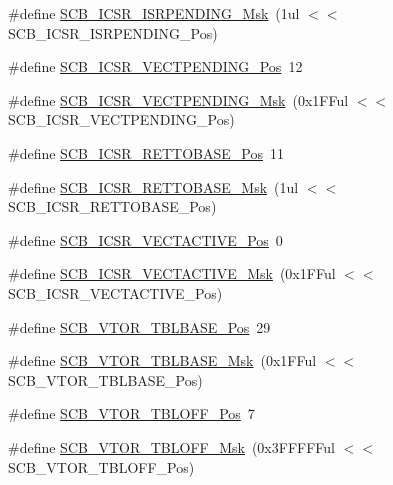 \begin{DoxyCompactItemize}
\item 
\#define \hyperlink{group__CMSIS__CM3__SCB_ga056d74fd538e5d36d3be1f28d399c877}{S\+C\+B\+\_\+\+I\+C\+S\+R\+\_\+\+I\+S\+R\+P\+E\+N\+D\+I\+N\+G\+\_\+\+Msk}~(1ul $<$$<$ S\+C\+B\+\_\+\+I\+C\+S\+R\+\_\+\+I\+S\+R\+P\+E\+N\+D\+I\+N\+G\+\_\+\+Pos)
\item 
\#define \hyperlink{group__CMSIS__CM3__SCB_gada60c92bf88d6fd21a8f49efa4a127b8}{S\+C\+B\+\_\+\+I\+C\+S\+R\+\_\+\+V\+E\+C\+T\+P\+E\+N\+D\+I\+N\+G\+\_\+\+Pos}~12
\item 
\#define \hyperlink{group__CMSIS__CM3__SCB_gacb6992e7c7ddc27a370f62878a21ef72}{S\+C\+B\+\_\+\+I\+C\+S\+R\+\_\+\+V\+E\+C\+T\+P\+E\+N\+D\+I\+N\+G\+\_\+\+Msk}~(0x1\+F\+Ful $<$$<$ S\+C\+B\+\_\+\+I\+C\+S\+R\+\_\+\+V\+E\+C\+T\+P\+E\+N\+D\+I\+N\+G\+\_\+\+Pos)
\item 
\#define \hyperlink{group__CMSIS__CM3__SCB_ga403d154200242629e6d2764bfc12a7ec}{S\+C\+B\+\_\+\+I\+C\+S\+R\+\_\+\+R\+E\+T\+T\+O\+B\+A\+S\+E\+\_\+\+Pos}~11
\item 
\#define \hyperlink{group__CMSIS__CM3__SCB_gaca6fc3f79bb550f64fd7df782ed4a5f6}{S\+C\+B\+\_\+\+I\+C\+S\+R\+\_\+\+R\+E\+T\+T\+O\+B\+A\+S\+E\+\_\+\+Msk}~(1ul $<$$<$ S\+C\+B\+\_\+\+I\+C\+S\+R\+\_\+\+R\+E\+T\+T\+O\+B\+A\+S\+E\+\_\+\+Pos)
\item 
\#define \hyperlink{group__CMSIS__CM3__SCB_gae4f602c7c5c895d5fb687b71b0979fc3}{S\+C\+B\+\_\+\+I\+C\+S\+R\+\_\+\+V\+E\+C\+T\+A\+C\+T\+I\+V\+E\+\_\+\+Pos}~0
\item 
\#define \hyperlink{group__CMSIS__CM3__SCB_ga5533791a4ecf1b9301c883047b3e8396}{S\+C\+B\+\_\+\+I\+C\+S\+R\+\_\+\+V\+E\+C\+T\+A\+C\+T\+I\+V\+E\+\_\+\+Msk}~(0x1\+F\+Ful $<$$<$ S\+C\+B\+\_\+\+I\+C\+S\+R\+\_\+\+V\+E\+C\+T\+A\+C\+T\+I\+V\+E\+\_\+\+Pos)
\item 
\#define \hyperlink{group__CMSIS__CM3__SCB_gad9720a44320c053883d03b883b955751}{S\+C\+B\+\_\+\+V\+T\+O\+R\+\_\+\+T\+B\+L\+B\+A\+S\+E\+\_\+\+Pos}~29
\item 
\#define \hyperlink{group__CMSIS__CM3__SCB_ga778dd0ba178466b2a8877a6b8aa345ee}{S\+C\+B\+\_\+\+V\+T\+O\+R\+\_\+\+T\+B\+L\+B\+A\+S\+E\+\_\+\+Msk}~(0x1\+F\+Ful $<$$<$ S\+C\+B\+\_\+\+V\+T\+O\+R\+\_\+\+T\+B\+L\+B\+A\+S\+E\+\_\+\+Pos)
\item 
\#define \hyperlink{group__CMSIS__CM3__SCB_gac6a55451ddd38bffcff5a211d29cea78}{S\+C\+B\+\_\+\+V\+T\+O\+R\+\_\+\+T\+B\+L\+O\+F\+F\+\_\+\+Pos}~7
\item 
\#define \hyperlink{group__CMSIS__CM3__SCB_ga75e395ed74042923e8c93edf50f0996c}{S\+C\+B\+\_\+\+V\+T\+O\+R\+\_\+\+T\+B\+L\+O\+F\+F\+\_\+\+Msk}~(0x3\+F\+F\+F\+F\+Ful $<$$<$ S\+C\+B\+\_\+\+V\+T\+O\+R\+\_\+\+T\+B\+L\+O\+F\+F\+\_\+\+Pos)

\end{DoxyCompactItemize}
